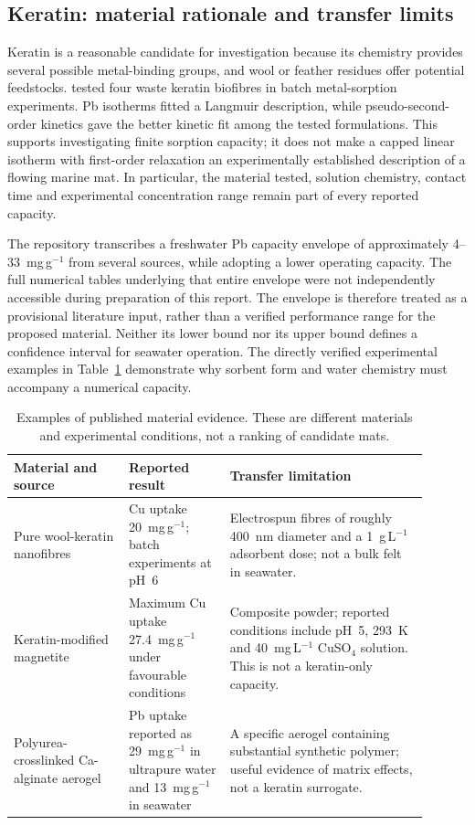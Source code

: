 \subsection{Keratin: material rationale and transfer limits}

Keratin is a reasonable candidate for investigation because its chemistry provides several possible metal-binding groups, and wool or feather residues offer potential feedstocks. \citet{zhang2019} tested four waste keratin biofibres in batch metal-sorption experiments. Pb isotherms fitted a Langmuir description, while pseudo-second-order kinetics gave the better kinetic fit among the tested formulations. This supports investigating finite sorption capacity; it does not make a capped linear isotherm with first-order relaxation an experimentally established description of a flowing marine mat. In particular, the material tested, solution chemistry, contact time and experimental concentration range remain part of every reported capacity.

The repository transcribes a freshwater Pb capacity envelope of approximately 4--33~mg\,g$^{-1}$ from several sources, while adopting a lower operating capacity. The full numerical tables underlying that entire envelope were not independently accessible during preparation of this report. The envelope is therefore treated as a provisional literature input, rather than a verified performance range for the proposed material. Neither its lower bound nor its upper bound defines a confidence interval for seawater operation. The directly verified experimental examples in Table~\ref{tab:material-evidence} demonstrate why sorbent form and water chemistry must accompany a numerical capacity.

\begin{table}[htbp]
\centering\small
\caption{Examples of published material evidence. These are different materials and experimental conditions, not a ranking of candidate mats.}
\label{tab:material-evidence}
\begin{tabular}{p{0.25\linewidth}p{0.22\linewidth}p{0.43\linewidth}}
\toprule
Material and source & Reported result & Transfer limitation \\
\midrule
Pure wool-keratin nanofibres \citep{aluigi2012} & Cu uptake 20~mg\,g$^{-1}$; batch experiments at pH~6 & Electrospun fibres of roughly 400~nm diameter and a 1~g\,L$^{-1}$ adsorbent dose; not a bulk felt in seawater. \\
Keratin-modified magnetite \citep{zhang2021} & Maximum Cu uptake 27.4~mg\,g$^{-1}$ under favourable conditions & Composite powder; reported conditions include pH~5, 293~K and 40~mg\,L$^{-1}$ CuSO$_4$ solution. This is not a keratin-only capacity. \\
Polyurea-crosslinked Ca-alginate aerogel \citep{paraskevopoulou2021} & Pb uptake reported as 29~mg\,g$^{-1}$ in ultrapure water and 13~mg\,g$^{-1}$ in seawater & A specific aerogel containing substantial synthetic polymer; useful evidence of matrix effects, not a keratin surrogate. \\
\bottomrule
\end{tabular}
\end{table}

